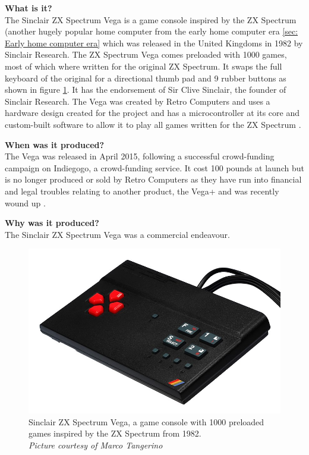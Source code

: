 \textbf{What is it?}\\
The Sinclair ZX Spectrum Vega is a game console inspired by the ZX Spectrum (another hugely popular home computer from the early home computer era \ref{sec: Early home computer era} which was released in the United Kingdoms in 1982 by Sinclair Research. The ZX Spectrum Vega comes preloaded with 1000 games, most of which where written for the original ZX Spectrum. It swaps the full keyboard of the original for a directional thumb pad and 9 rubber buttons as shown in figure \ref{Spectrum_Vega}. It has the endorsement of Sir Clive Sinclair, the founder of Sinclair Research. The Vega was created by Retro Computers and uses a hardware design created for the project and has a microcontroller at its core and custom-built software to allow it to play all games written for the ZX Spectrum \cite{RN119}.

\textbf{When was it produced?}\\
The Vega was released in April 2015, following a successful crowd-funding campaign on Indiegogo, a crowd-funding service. It cost 100 pounds at launch but is no longer produced or sold by Retro Computers as they have run into financial and legal troubles relating to another product, the Vega+ and was recently wound up 
\cite{RN120}.  

\textbf{Why was it produced?}\\
The Sinclair ZX Spectrum Vega was a commercial endeavour. 

\begin{figure} \begin{center}
\includegraphics[width=.3\linewidth]{pics/Spectrum_Vega} 
\end{center} 
\caption{Sinclair ZX Spectrum Vega, a game console with 1000 preloaded games inspired by the ZX Spectrum from 1982. \\ \textit{\small{Picture courtesy of Marco Tangerino}}}
\label{Spectrum_Vega}
\end{figure} 

